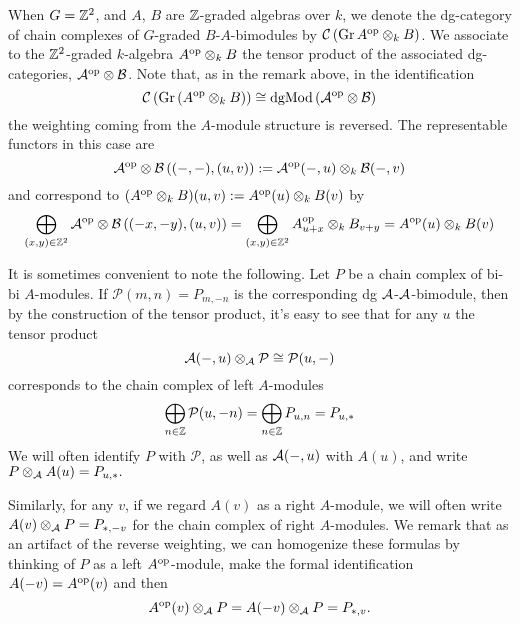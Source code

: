 When \(G = \mathbb{Z}^2\), and \(A\), \(B\) are \(\mathbb{Z}\)-graded algebras over \(k\), we denote the dg-category of chain complexes of \(G\)-graded \(B\)-\(A\)-bimodules by \(\mathcal{C}\left(\operatorname{Gr}A^{\operatorname{op}} \otimes_k B\right)\).
We associate to the \(\mathbb{Z}^2\)-graded \(k\)-algebra \(A^{\operatorname{op}} \otimes_k B\) the tensor product of the associated dg-categories, \(\mathcal{A}^{\operatorname{op}} \otimes \mathcal{B}\).
Note that, as in the remark above, in the identification
\[\mathcal{C}\left(\operatorname{Gr}\left(A^{\operatorname{op}} \otimes_k B\right)\right) \cong \operatorname{dgMod}\left(\mathcal{A}^{\operatorname{op}} \otimes \mathcal{B}\right)\]
the weighting coming from the \(A\)-module structure is reversed.
The representable functors in this case are
\[\mathcal{A}^{\operatorname{op}} \otimes \mathcal{B}\left((-,-), (u,v)\right) := \mathcal{A}^{\operatorname{op}}(-, u) \otimes_k \mathcal{B}(-,v)\]
and correspond to \((A^{\operatorname{op}} \otimes_k B)(u,v) := A^{\operatorname{op}}(u) \otimes_k B(v)\) by 
\[\bigoplus_{(x,y) \in \mathbb{Z}^2} \mathcal{A}^{\operatorname{op}} \otimes \mathcal{B}\left((-x,-y),(u,v)\right) = \bigoplus_{(x,y) \in \mathbb{Z}^2} A^{\operatorname{op}}_{u + x} \otimes_k B_{v + y} = A^{\operatorname{op}}(u) \otimes_k B(v)\]


\begin{remark}\label{remark: tensor with twist}
  It is sometimes convenient to note the following.
  Let \(P\) be a chain complex of bi-bi \(A\)-modules.
  If \(\mathcal{P}(m,n) = P_{m,-n}\) is the corresponding dg \(\mathcal{A}\)-\(\mathcal{A}\)-bimodule, then by the construction of the tensor product, it's easy to see that for any \(u\) the tensor product 
  \[\mathcal{A}(-, u) \otimes_{\mathcal{A}} \mathcal{P} \cong \mathcal{P}(u, -)\]
  corresponds to the chain complex of left \(A\)-modules
  \[\bigoplus_{n \in \mathbb{Z}} \mathcal{P}(u,-n) = \bigoplus_{n \in \mathbb{Z}} P_{u,n} = P_{u, \ast}\]
  We will often identify \(P\) with \(\mathcal{P}\), as well as \(\mathcal{A}(-, u)\) with \(A(u)\), and write
  \(P \otimes_{\mathcal{A}} A(u)= P_{u,\ast}.\)

  Similarly, for any \(v\), if we regard \(A(v)\) as a right \(A\)-module, we will often write \(A(v) \otimes_{\mathcal{A}} P = P_{\ast,-v}\) for the chain complex of right \(A\)-modules.
  We remark that as an artifact of the reverse weighting, we can homogenize these formulas by thinking of \(P\) as a left \(A^{\operatorname{op}}\)-module, make the formal identification \(A(-v) = A^{\operatorname{op}}(v)\) and then
  \[A^{\operatorname{op}}(v) \otimes_{\mathcal{A}} P = A(-v) \otimes_{\mathcal{A}} P = P_{\ast,v}.\]
\end{remark}
